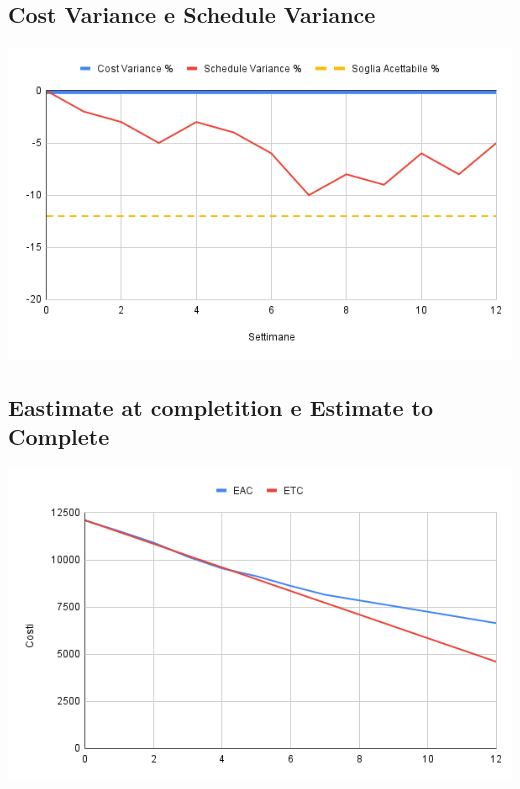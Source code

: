 \documentclass[a4paper, 12pt]{article}
\begin{document}
\subsection{Cost Variance e Schedule Variance}
\begin{center}
	\includegraphics[scale=0.5]{Cost_Variance_Schedule_Variance.png}
\end{center}

\subsection{Eastimate at completition e Estimate to Complete}
\begin{center}
	\includegraphics[scale=0.6]{EAC_ETC.png}
\end{center}
\end{document}
